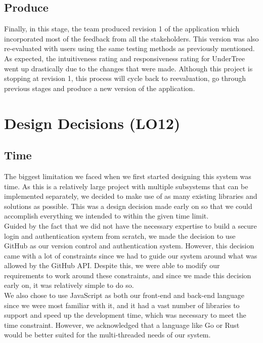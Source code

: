 \documentclass{article}
\begin{document}
	\subsection{Produce}
	
	Finally, in this stage, the team produced revision 1 of the application which incorporated most of the feedback from all the stakeholders. This version was also re-evaluated with users using the same testing methods as previously mentioned. As expected, the intuitiveness rating and responsiveness rating for UnderTree went up drastically due to the changes that were made. Although this project is stopping at revision 1, this process will cycle back to reevaluation, go through previous stages and produce a new version of the application.
	
	\section{Design Decisions (LO12)}
	
	\subsection{Time}
	
	\noindent The biggest limitation we faced when we first started designing this system was time. As this is a relatively large project with multiple subsystems that can be implemented separately, we decided to make use of as many existing libraries and solutions as possible. This was a design decision made early on so that we could accomplish everything we intended to within the given time limit.\\
	
	\noindent Guided by the fact that we did not have the necessary expertise to build a secure login and authentication system from scratch, we made the decision to use GitHub as our version control and authentication system. However, this decision came with a lot of constraints since we had to guide our system around what was allowed by the GitHub API. Despite this, we were able to modify our requirements to work around these constraints, and since we made this decision early on, it was relatively simple to do so.\\
	
	\noindent We also chose to use JavaScript as both our front-end and back-end language since we were most familiar with it, and it had a vast number of libraries to support and speed up the development time, which was necessary to meet the time constraint. However, we acknowledged that a language like Go or Rust would be better suited for the multi-threaded needs of our system.
	
\end{document}
